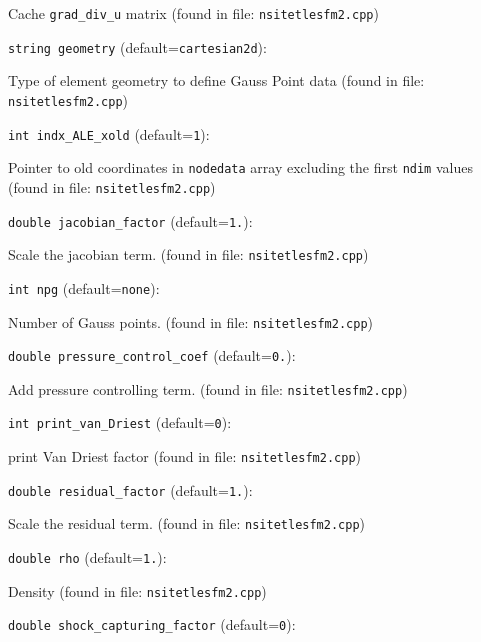 Cache  \verb+grad_div_u+  matrix
 (found in file: \verb+nsitetlesfm2.cpp+)
\item\verb+string geometry+ {\rm(default=\verb|cartesian2d|)}:

Type of element geometry to define Gauss Point data
 (found in file: \verb+nsitetlesfm2.cpp+)
\item\verb+int indx_ALE_xold+ {\rm(default=\verb|1|)}:

Pointer to old coordinates in
 \verb+nodedata+ array excluding the first \verb+ndim+ values
 (found in file: \verb+nsitetlesfm2.cpp+)
\item\verb+double jacobian_factor+ {\rm(default=\verb|1.|)}:

Scale the jacobian term. 
 (found in file: \verb+nsitetlesfm2.cpp+)
\item\verb+int npg+ {\rm(default=\verb|none|)}:

Number of Gauss points.
 (found in file: \verb+nsitetlesfm2.cpp+)
\item\verb+double pressure_control_coef+ {\rm(default=\verb|0.|)}:

Add pressure controlling term. 
 (found in file: \verb+nsitetlesfm2.cpp+)
\item\verb+int print_van_Driest+ {\rm(default=\verb|0|)}:

print Van Driest factor
 (found in file: \verb+nsitetlesfm2.cpp+)
\item\verb+double residual_factor+ {\rm(default=\verb|1.|)}:

Scale the residual term. 
 (found in file: \verb+nsitetlesfm2.cpp+)
\item\verb+double rho+ {\rm(default=\verb|1.|)}:

Density
 (found in file: \verb+nsitetlesfm2.cpp+)
\item\verb+double shock_capturing_factor+ {\rm(default=\verb|0|)}:

